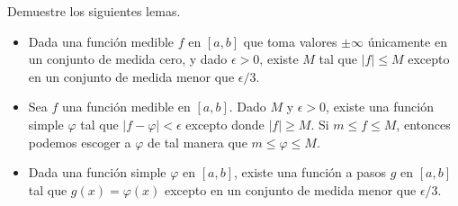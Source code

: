 \documentclass[12pt]{article}
\newenvironment{problem}[2][Problema]{\begin{trivlist}
\item[\hskip \labelsep {\bfseries #1}\hskip \labelsep {\bfseries #2.}]}{\end{trivlist}}
\begin{document}
\begin{problem}{8} Demuestre los siguientes lemas.
\begin{itemize}
    \item[a)] Dada una función medible $f$ en $[a, b]$ que toma valores $\pm \infty $ únicamente en un conjunto de medida cero, y dado $\epsilon > 0$, existe $M$ tal que $\lvert f \rvert \leq M$ excepto en un conjunto de medida menor que $\epsilon / 3.$
    \item[b)] Sea $f$ una función medible en $[a, b]$. Dado $M $ y $\epsilon > 0$, existe una función simple $\varphi$ tal que $\lvert f - \varphi \rvert  < \epsilon $ excepto donde $\lvert f \rvert \geq M .$ Si $m \leq f \leq M$, entonces podemos escoger a $\varphi$ de tal manera que $m \leq \varphi \leq M$. 
    \item[c)] Dada una función simple $\varphi$ en $[a, b]$, existe una función a pasos $g$ en $[a, b]$ tal que $g(x) = \varphi(x)$ excepto en un conjunto de medida menor que $\epsilon / 3$. 
\end{itemize}
\end{problem}
\end{document}
